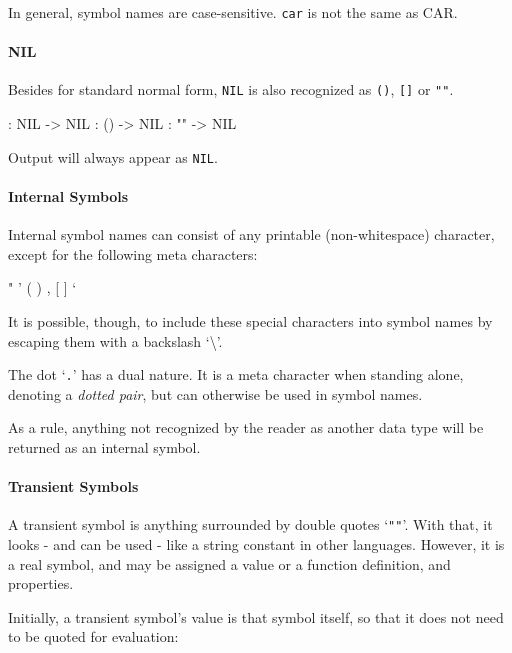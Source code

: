 In general, symbol names are case-sensitive. \texttt{car} is not the same as
CAR.

 
\paragraph{NIL}
\label{sec:refm-nil}%
Besides for standard normal form, \texttt{NIL} is also recognized as
\texttt{()}, \texttt{[]} or \texttt{""}.


\begin{wideverbatim}
: NIL
-> NIL
: ()
-> NIL
: ""
-> NIL
\end{wideverbatim}

Output will always appear as \texttt{NIL}.



\paragraph{Internal Symbols}
\label{sec:refm-internal-symbols}%
Internal symbol names can consist of any printable (non-whitespace)
character, except for the following meta characters:


\begin{wideverbatim}
"  '  (  )  ,  [  ]  `  ~ { }
\end{wideverbatim}

It is possible, though, to include these special characters into symbol
names by escaping them with a backslash `\textbackslash'.

The dot `\texttt{.}' has a dual nature. It is a meta character when standing
alone, denoting a \emph{dotted pair}, but can otherwise be used in
symbol names.

As a rule, anything not recognized by the reader as another data type
will be returned as an internal symbol.



\paragraph{Transient Symbols}
\label{sec:refm-transient-symbols}%
A transient symbol is anything surrounded by double quotes `\texttt{""}'. With
that, it looks - and can be used - like a string constant in other
languages. However, it is a real symbol, and may be assigned a value or
a function definition, and properties.

Initially, a transient symbol's value is that symbol itself, so that it
does not need to be quoted for evaluation:



